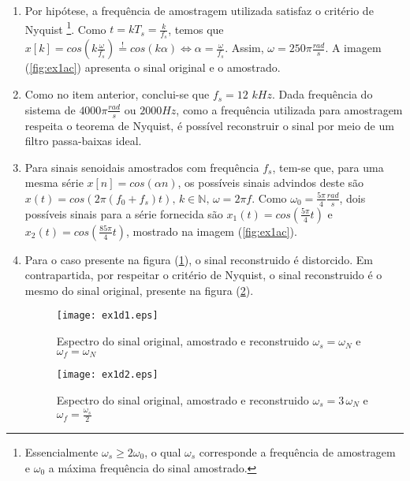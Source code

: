     \begin{enumerate}

        \item %
        
        Por hipótese, a frequência de amostragem utilizada satisfaz o critério de Nyquist \footnote{Essencialmente $\omega_s \geq 2\omega_0$, o qual $\omega_s$ corresponde a frequência de amostragem e $\omega_0$ a máxima frequência do sinal amostrado.}. Como $t = kT_s = \frac{k}{f_s}$, temos que $x[k] = cos(k \frac{\omega}{f_s})  \stackrel{!}{=} cos(k \alpha) \Longleftrightarrow \alpha = \frac{\omega}{f_s}$. Assim, $\omega = 250\pi \frac{rad}{s}$. A imagem (\ref{fig:ex1ac}) apresenta o sinal original e o amostrado.
        
        \item %
        
        Como no item anterior, conclui-se que $f_s = 12$ $kHz$. Dada frequência do sistema de $4000\pi \frac{rad}{s}$ ou $2000 Hz$, como a frequência utilizada para amostragem respeita o teorema de Nyquist, é possível reconstruir o sinal por meio de um filtro passa-baixas ideal. 
        
        \item %
        Para sinais senoidais amostrados com frequência $f_s$, tem-se que, para uma mesma série $x[n] = cos(\alpha n)$, os possíveis sinais advindos deste são $x(t) = cos(2 \pi (f_0 + f_s)t) \mbox{, } k \in \mathbb{N} \mbox{, } \omega = 2 \pi f$. Como $\omega_0 = \frac{5\pi}{4} \frac{rad}{s}$, dois possíveis sinais para a série fornecida são $x_1(t) = cos(\frac{5\pi}{4} t )$ e $x_2(t) = cos(\frac{85\pi}{4} t)$, mostrado na imagem (\ref{fig:ex1ac}). 
        
        \item %
        
        Para o caso presente na figura (\ref{fig:ex1d1}), o sinal reconstruido é distorcido. Em contrapartida, por respeitar o critério de Nyquist, o sinal reconstruido é o mesmo do sinal original, presente na figura (\ref{fig:ex1d2}).
        
        \newpage

        \begin{figure}[H]
            \centering
            \texttt{[image: ex1d1.eps]}
            \caption{Espectro do sinal original, amostrado e reconstruido $\omega_s = \omega_N$ e $\omega_f = \omega_N$}
            \label{fig:ex1d1}
        \end{figure}%
    
        \begin{figure}[H]
            \centering
            \texttt{[image: ex1d2.eps]}
            \caption{Espectro do sinal original, amostrado e reconstruido $\omega_s = 3 \, \omega_N$ e $\omega_f = \frac{\omega_s}{2}$}
            \label{fig:ex1d2}
        \end{figure}
    
    \end{enumerate}
